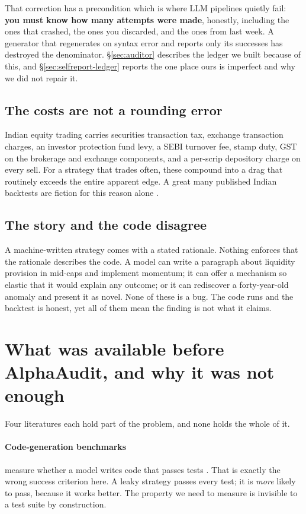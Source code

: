 \documentclass[11pt,a4paper]{article}
\begin{document}
That correction has a precondition which is where LLM pipelines quietly fail: \textbf{you must
know how many attempts were made}, honestly, including the ones that crashed, the ones you
discarded, and the ones from last week. A generator that regenerates on syntax error and reports
only its successes has destroyed the denominator. \S\ref{sec:auditor} describes the ledger we
built because of this, and \S\ref{sec:selfreport-ledger} reports the one place ours is imperfect
and why we did not repair it.

\subsection{The costs are not a rounding error}

Indian equity trading carries securities transaction tax, exchange transaction charges, an
investor protection fund levy, a SEBI turnover fee, stamp duty, GST on the brokerage and exchange
components, and a per-scrip depository charge on every sell. For a strategy that trades often,
these compound into a drag that routinely exceeds the entire apparent edge. A great many published
Indian backtests are fiction for this reason alone \citep{novymarx2016,frazzini2018}.

\subsection{The story and the code disagree}

A machine-written strategy comes with a stated rationale. Nothing enforces that the rationale
describes the code. A model can write a paragraph about liquidity provision in mid-caps and
implement momentum; it can offer a mechanism so elastic that it would explain any outcome; or it
can rediscover a forty-year-old anomaly and present it as novel. None of these is a bug. The
code runs and the backtest is honest, yet all of them mean the finding is not what it claims.

\section{What was available before AlphaAudit, and why it was not enough}
\label{sec:related}

Four literatures each hold part of the problem, and none holds the whole of it.

\paragraph{Code-generation benchmarks} measure whether a model writes code that passes tests
\citep{chen2021}. That is exactly the wrong success criterion here. A leaky strategy passes every
test; it is \emph{more} likely to pass, because it works better. The property we need to measure
is invisible to a test suite by construction.
\end{document}
